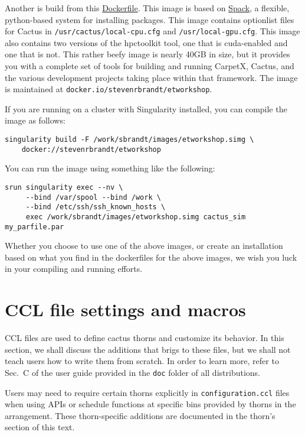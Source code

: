 Another is build from this \href{https://github.com/stevenrbrandt/carpetx-install}{Dockerfile}. This image is based on \href{https://github.com/spack/spack}{Spack}, a flexible, python-based system for installing packages. This image contains optionlist files for Cactus in \texttt{/usr/cactus/local-cpu.cfg} and \texttt{/usr/local-gpu.cfg}. This image also contains two versions of the hpctoolkit tool, one that is cuda-enabled and one that is not. This rather beefy image is nearly 40GB in size, but it provides you with a complete set of tools for building and running CarpetX, Cactus, and the various development projects taking place within that framework. The image is maintained at \texttt{docker.io/stevenrbrandt/etworkshop}.

If you are running on a cluster with Singularity installed, you can compile the image as follows:

\begin{lstlisting}
singularity build -F /work/sbrandt/images/etworkshop.simg \
    docker://stevenrbrandt/etworkshop
\end{lstlisting}

You can run the image using something like the following:
\begin{lstlisting}
srun singularity exec --nv \
     --bind /var/spool --bind /work \
     --bind /etc/ssh/ssh_known_hosts \
     exec /work/sbrandt/images/etworkshop.simg cactus_sim my_parfile.par
\end{lstlisting}

Whether you choose to use one of the above images, or create an installation based on what you find in the dockerfiles for the above images, we wish you luck in your compiling and running efforts.

\section{CCL file settings and macros}
\label{sec:ccl_files}
CCL files are used to define cactus thorns and customize its behavior. In this section, we shall discuss the additions that \CarpetX\space brigs to these files, but we shall not teach users how to write them from scratch. In order to learn more, refer to Sec.~C of the \Cactus\space user guide provided in the \texttt{doc} folder of all distributions.

Users may need to require certain thorns explicitly in \texttt{configuration.ccl} files when using \CarpetX\space APIs or schedule functions at specific bins provided by thorns in the \CarpetX\space arrangement. These thorn-specific additions are documented in the thorn's section of this text.

